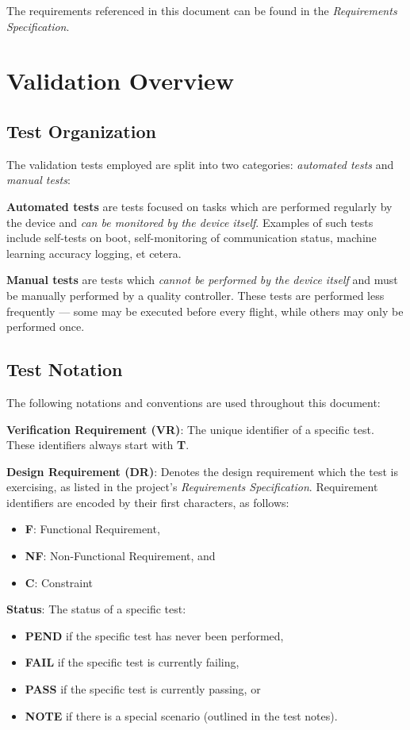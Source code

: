 \documentclass[10pt,letterpaper]{article}
\begin{document}
The requirements referenced in this document can be found in the \textit{Requirements Specification}.

\section{Validation Overview}

\subsection{Test Organization}\label{auto}
The validation tests employed are split into two categories: \textit{automated tests} and \textit{manual tests}:

\textbf{Automated tests} are tests focused on tasks which are performed regularly by the device and \textit{can be monitored by the device itself}. Examples of such tests include self-tests on boot, self-monitoring of communication status, machine learning accuracy logging, et cetera.

\textbf{Manual tests} are tests which \textit{cannot be performed by the device itself} and must be manually performed by a quality controller. These tests are performed less frequently --- some may be executed before every flight, while others may only be performed once. 

\subsection{Test Notation}
The following notations and conventions are used throughout this document:

\textbf{Verification Requirement (VR)}: The unique identifier of a specific test. These identifiers always start with \textbf{T}.

\textbf{Design Requirement (DR)}: Denotes the design requirement which the test is exercising, as listed in the project's \textit{Requirements Specification}. Requirement identifiers are encoded by their first characters, as follows:
\begin{itemize}
	\item \textbf{F}: Functional Requirement,
	\item \textbf{NF}: Non-Functional Requirement, and
	\item \textbf{C}: Constraint
\end{itemize}

\textbf{Status}: The status of a specific test:
\begin{itemize}
	\item \textbf{PEND} if the specific test has never been performed,
	\item \textbf{FAIL} if the specific test is currently failing,
	\item \textbf{PASS} if the specific test is currently passing, or
	\item \textbf{NOTE} if there is a special scenario (outlined in the test notes).
\end{itemize}
\end{document}

